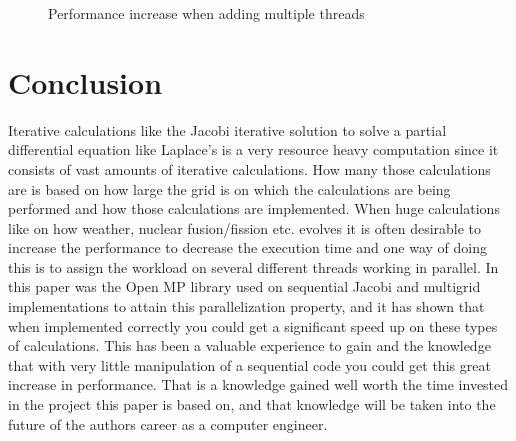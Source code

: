 \documentclass{article}
\begin{document}
\begin{figure}
\hspace{4em}
\caption{Performance increase when adding multiple threads}
\end{figure}


\section{Conclusion}\label{conclusion}

Iterative calculations like the Jacobi iterative solution to solve a partial differential equation like Laplace’s is a very resource heavy computation since  it consists of vast amounts of iterative calculations. How many those calculations are is based on how large the grid is on which the calculations are being performed and how those calculations are implemented. When huge calculations like on how weather, nuclear fusion/fission etc. evolves it is often desirable to increase the performance to decrease the execution time and one way of doing this is to assign the workload on several different threads working in parallel. In this paper was the Open MP library used on sequential Jacobi and multigrid implementations to attain this parallelization property, and it has shown that when implemented correctly you could get a significant speed up on these types of calculations. This has been a valuable experience to gain and the knowledge that with very little manipulation of a sequential code you could get this great increase in performance. That is a knowledge gained well worth the time invested in the project this paper is based on, and that knowledge will be taken into the future of the authors career as a computer engineer. 
\end{document}
